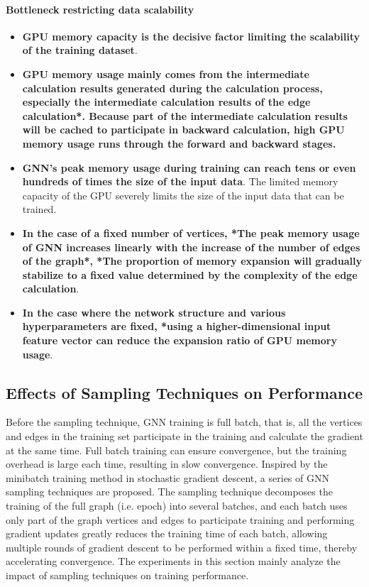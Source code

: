 \paragraph{Bottleneck restricting data scalability}
\begin{itemize}
    \item \textbf{GPU memory capacity is the decisive factor limiting the scalability of the training dataset}.
    \item \textbf{GPU memory usage mainly comes from the intermediate calculation results generated during the calculation process,
     especially the intermediate calculation results of the edge calculation*. Because part of the intermediate calculation results
    will be cached to participate in backward calculation, high GPU memory usage runs through the forward and backward stages.}
    \item \textbf{GNN's peak memory usage during training can reach tens or even hundreds of times the size of the input data}. The limited memory capacity of the GPU severely limits the size of the input data that can be trained.
    \item \textbf{In the case of a fixed number of vertices, *The peak memory usage of GNN increases linearly with the increase of the number of edges of the graph*, *The proportion of memory expansion will gradually stabilize to a fixed value determined by the complexity of the edge calculation}.
    \item \textbf{In the case where the network structure and various hyperparameters are fixed, *using a higher-dimensional input feature vector can reduce the expansion ratio of GPU memory usage}.
\end{itemize}

\label{sec:memory_usage_analysis}
\subsection{Effects of Sampling Techniques on Performance}

Before the sampling technique, GNN training is full batch, that is, all the vertices and edges in the training set participate in the training and calculate the gradient at the same time.
Full batch training can ensure convergence, but the training overhead is large each time, resulting in slow convergence.
Inspired by the minibatch training method in stochastic gradient descent, a series of GNN sampling techniques are proposed.
The sampling technique decomposes the training of the full graph (i.e. epoch) into several batches, and
each batch uses only part of the graph vertices and edges to participate training and performing gradient
updates greatly reduces the training time of each batch, allowing multiple rounds of gradient descent to
be performed within a fixed time, thereby accelerating convergence. The experiments in this section mainly
analyze the impact of sampling techniques on training performance.

